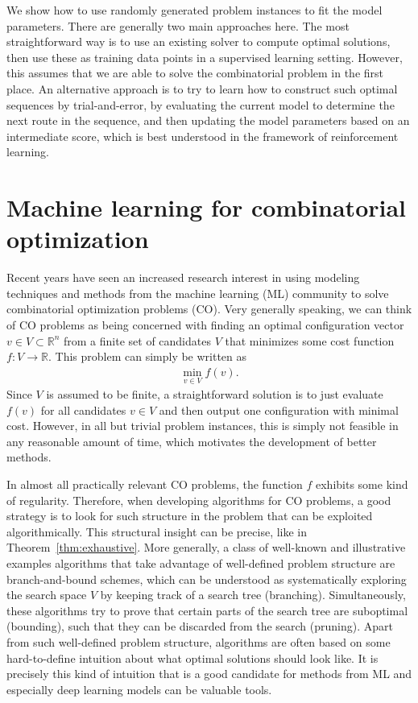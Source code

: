 \documentclass[a4paper]{report}
\theoremstyle{definition}
\theoremstyle{plain}
\begin{document}
We show how to use randomly generated problem instances to fit the model
parameters.
%
There are generally two main approaches here. The most straightforward way is to
use an existing solver to compute optimal solutions, then use these as training
data points in a supervised learning setting.
%
However, this assumes that we are able to solve the combinatorial problem in the
first place.
%
An alternative approach is to try to learn how to construct such optimal
sequences by trial-and-error, by evaluating the current model to determine the
next route in the sequence, and then updating the model parameters based on an
intermediate score, which is best understood in the framework of reinforcement
learning.

\clearpage

\section{Machine learning for combinatorial optimization}\label{sec:ml-co}

Recent years have seen an increased research interest in using modeling
techniques and methods from the machine learning (ML) community to solve
combinatorial optimization problems (CO).
%
Very generally speaking, we can think of CO problems as being concerned with
finding an optimal configuration vector $v \in V \subset \mathbb{R}^n$ from a finite set
of candidates $V$ that minimizes some cost function $f : V \rightarrow \mathbb{R}$. This
problem can simply be written as
\begin{align}
  \min_{v \in V} f(v) .
\end{align}
%
Since $V$ is assumed to be finite, a straightforward solution is to just
evaluate $f(v)$ for all candidates $v \in V$ and then output one configuration
with minimal cost.
%
However, in all but trivial problem instances, this is simply not feasible in
any reasonable amount of time, which motivates the development of better
methods.

In almost all practically relevant CO problems, the function $f$ exhibits some
kind of regularity.
%
Therefore, when developing algorithms for CO problems, a good strategy is to look for such
structure in the problem that can be exploited algorithmically.
%
This structural insight can be precise, like in Theorem~\ref{thm:exhaustive}.
%
More generally, a class of well-known and illustrative examples algorithms that
take advantage of well-defined problem structure are branch-and-bound schemes,
which can be understood as systematically exploring the search space $V$ by
keeping track of a search tree (branching).
%
Simultaneously, these algorithms try to prove that certain parts of the search
tree are suboptimal (bounding), such that they can be discarded from the search
(pruning).
%
Apart from such well-defined problem structure, algorithms are often based on
some hard-to-define intuition about what optimal solutions should look like.
%
It is precisely this kind of intuition that is a good candidate for methods from
ML and especially deep learning models can be valuable tools.
\end{document}
